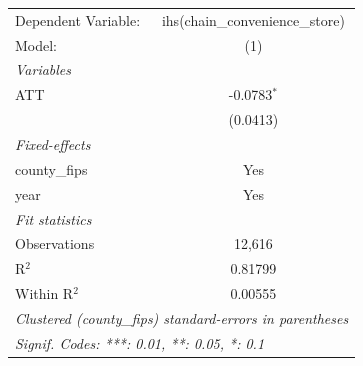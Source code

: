 
\begingroup
\centering
\begin{tabular}{lc}
   \tabularnewline \midrule \midrule
   Dependent Variable: & ihs(chain\_convenience\_store)\\    
   Model:              & (1)\\  
   \midrule
   \emph{Variables}\\
   ATT                 & -0.0783$^{*}$\\   
                       & (0.0413)\\   
   \midrule
   \emph{Fixed-effects}\\
   county\_fips        & Yes\\  
   year                & Yes\\  
   \midrule
   \emph{Fit statistics}\\
   Observations        & 12,616\\  
   R$^2$               & 0.81799\\  
   Within R$^2$        & 0.00555\\  
   \midrule \midrule
   \multicolumn{2}{l}{\emph{Clustered (county\_fips) standard-errors in parentheses}}\\
   \multicolumn{2}{l}{\emph{Signif. Codes: ***: 0.01, **: 0.05, *: 0.1}}\\
\end{tabular}
\par\endgroup


